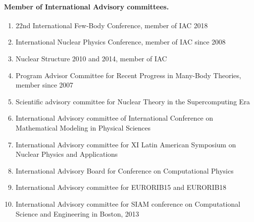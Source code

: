 \documentclass[%
oneside,                 %
final,                   %
10pt]{article}
\begin{document}
\noindent
\paragraph{Member of International Advisory committees.}
\begin{enumerate}
\item 22nd International Few-Body Conference, member of IAC 2018

\item International Nuclear Physics Conference, member of IAC since 2008

\item Nuclear Structure 2010 and 2014, member of IAC

\item Program Advisor Committee for Recent Progress in Many-Body Theories, member since 2007

\item Scientific advisory committee for Nuclear Theory in the Supercomputing Era 

\item International Advisory committee of International Conference on Mathematical Modeling in Physical Sciences

\item International Advisory committee for XI Latin American Symposium on Nuclear Physics and Applications 

\item International Advisory Board for Conference on Computational Physics

\item International Advisory committee for EURORIB15 and EURORIB18

\item International Advisory committee for SIAM conference on Computational Science and Engineering in Boston, 2013
\end{enumerate}

\noindent
\end{document}
